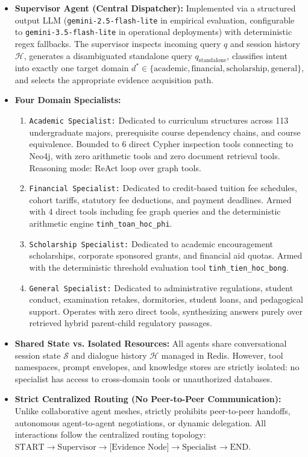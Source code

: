 \begin{itemize}
    \item \textbf{Supervisor Agent (Central Dispatcher):} Implemented via a structured output LLM (\texttt{gemini-2.5-flash-lite} in empirical evaluation, configurable to \texttt{gemini-3.5-flash-lite} in operational deployments) with deterministic regex fallbacks. The supervisor inspects incoming query $q$ and session history $\mathcal{H}$, generates a disambiguated standalone query $q_{\text{standalone}}$, classifies intent into exactly one target domain $d^* \in \{\text{academic}, \text{financial}, \text{scholarship}, \text{general}\}$, and selects the appropriate evidence acquisition path.
    
    \item \textbf{Four Domain Specialists:}
    \begin{enumerate}
        \item \texttt{Academic Specialist:} Dedicated to curriculum structures across 113 undergraduate majors, prerequisite course dependency chains, and course equivalence. Bounded to 6 direct Cypher inspection tools connecting to Neo4j, with zero arithmetic tools and zero document retrieval tools. Reasoning mode: ReAct loop over graph tools.
        \item \texttt{Financial Specialist:} Dedicated to credit-based tuition fee schedules, cohort tariffs, statutory fee deductions, and payment deadlines. Armed with 4 direct tools including fee graph queries and the deterministic arithmetic engine \texttt{tinh\_toan\_hoc\_phi}.
        \item \texttt{Scholarship Specialist:} Dedicated to academic encouragement scholarships, corporate sponsored grants, and financial aid quotas. Armed with the deterministic threshold evaluation tool \texttt{tinh\_tien\_hoc\_bong}.
        \item \texttt{General Specialist:} Dedicated to administrative regulations, student conduct, examination retakes, dormitories, student loans, and pedagogical support. Operates with zero direct tools, synthesizing answers purely over retrieved hybrid parent-child regulatory passages.
    \end{enumerate}

    \item \textbf{Shared State vs. Isolated Resources:} All agents share conversational session state $\mathcal{S}$ and dialogue history $\mathcal{H}$ managed in Redis. However, tool namespaces, prompt envelopes, and knowledge stores are strictly isolated: no specialist has access to cross-domain tools or unauthorized databases.
    
    \item \textbf{Strict Centralized Routing (No Peer-to-Peer Communication):} Unlike collaborative agent meshes, \system{} strictly prohibits peer-to-peer handoffs, autonomous agent-to-agent negotiations, or dynamic delegation. All interactions follow the centralized routing topology: $\text{START} \rightarrow \text{Supervisor} \rightarrow \text{[Evidence Node]} \rightarrow \text{Specialist} \rightarrow \text{END}$.
\end{itemize}

